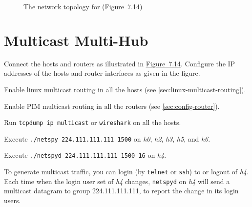 \documentclass{../UTNetLab}
\begin{document}
\begin{figure}[H]
        \caption{The network topology for  (Figure~7.14)}
        \label{fig:7.14}
    \end{figure}

\section{Multicast Multi-Hub}
    Connect the hosts and routers as illustrated in \hyperref[fig:7.14]{Figure~7.14}.
    Configure the IP addresses of the hosts and router interfaces as given in the figure.


    Enable linux multicast routing in all the hosts (see \autoref{sec:linux-multicast-routing}).

    Enable PIM multicast routing in all the routers (see \autoref{sec:config-router}). 

    Run \lstinline{tcpdump ip multicast} or \lstinline{wireshark} on all the hosts. 

    Execute \lstinline{./netspy 224.111.111.111 1500} on \textit{h0}, \textit{h2}, \textit{h3}, \textit{h5}, and \textit{h6}.

    Execute \lstinline{./netspyd 224.111.111.111 1500 16} on \textit{h4}.
    
    To generate multicast traffic, you can login (by \lstinline{telnet} or \lstinline{ssh}) to or logout of \textit{h4}.
    Each time when the login user set of \textit{h4} changes, \lstinline{netspyd} on \textit{h4} will send a multicast datagram to group 224.111.111.111, to report the change in its login users.
\end{document}
